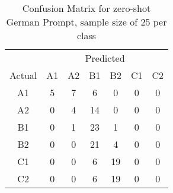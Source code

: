 \begin{table}[ht]
    \centering
    \begin{tabular}{c|cccccc}
        & \multicolumn{6}{c}{Predicted} \\
        Actual & A1 & A2 & B1 & B2 & C1 & C2 \\
        \hline
        A1 & \cellcolor[rgb]{0.8,0.96,0.8}5 & \cellcolor[rgb]{0.72,0.95,0.72}7 & \cellcolor[rgb]{0.76,0.95,0.76}6 & \cellcolor[rgb]{1,1,1}0 & \cellcolor[rgb]{1,1,1}0 & \cellcolor[rgb]{1,1,1}0 \\
        A2 & \cellcolor[rgb]{1,1,1}0 & \cellcolor[rgb]{0.84,0.97,0.84}4 & \cellcolor[rgb]{0.5,0.89,0.5}14 & \cellcolor[rgb]{1,1,1}0 & \cellcolor[rgb]{1,1,1}0 & \cellcolor[rgb]{1,1,1}0 \\
        B1 & \cellcolor[rgb]{1,1,1}0 & \cellcolor[rgb]{0.97,1,0.97}1 & \cellcolor[rgb]{0.23,0.81,0.23}23 & \cellcolor[rgb]{0.97,1,0.97}1 & \cellcolor[rgb]{1,1,1}0 & \cellcolor[rgb]{1,1,1}0 \\
        B2 & \cellcolor[rgb]{1,1,1}0 & \cellcolor[rgb]{1,1,1}0 & \cellcolor[rgb]{0.28,0.83,0.28}21 & \cellcolor[rgb]{0.84,0.97,0.84}4 & \cellcolor[rgb]{1,1,1}0 & \cellcolor[rgb]{1,1,1}0 \\
        C1 & \cellcolor[rgb]{1,1,1}0 & \cellcolor[rgb]{1,1,1}0 & \cellcolor[rgb]{0.76,0.95,0.76}6 & \cellcolor[rgb]{0.34,0.85,0.34}19 & \cellcolor[rgb]{1,1,1}0 & \cellcolor[rgb]{1,1,1}0 \\
        C2 & \cellcolor[rgb]{1,1,1}0 & \cellcolor[rgb]{1,1,1}0 & \cellcolor[rgb]{0.76,0.95,0.76}6 & \cellcolor[rgb]{0.34,0.85,0.34}19 & \cellcolor[rgb]{1,1,1}0 & \cellcolor[rgb]{1,1,1}0 \\
    \end{tabular}
    \caption{Confusion Matrix for zero-shot German Prompt, sample size of 25 per class}
    \label{tab:zero_shot_confusion_matrix}
\end{table}

